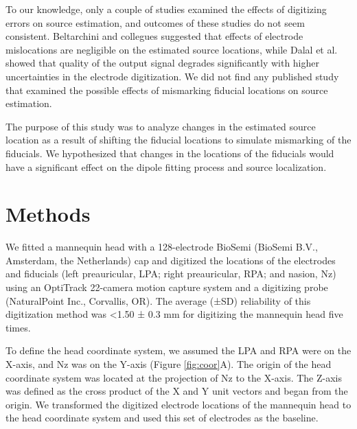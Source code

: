 \documentclass{UCF_ETD}
\begin{document}
To our knowledge, only a couple of studies examined the effects of digitizing errors on source estimation, and outcomes of these studies do not seem consistent. Beltarchini and collegues \cite{Beltrachini2011-je} suggested that effects of electrode mislocations are negligible on the estimated source locations, while Dalal et al. \cite{Dalal2014-nk} showed that quality of the output signal degrades significantly with higher uncertainties in the electrode digitization. We did not find any published study that examined the possible effects of mismarking fiducial locations on source estimation.

The purpose of this study was to analyze changes in the estimated source location as a result of shifting the fiducial locations to simulate mismarking of the fiducials. We hypothesized that changes in the locations of the fiducials would have a significant effect on the dipole fitting process and source localization.

\section{Methods}

We fitted a mannequin head with a 128-electrode BioSemi (BioSemi B.V., Amsterdam, the Netherlands) cap and digitized the locations of the electrodes and fiducials (left preauricular, LPA; right preauricular, RPA; and nasion, Nz) using an OptiTrack 22-camera motion capture system and a digitizing probe (NaturalPoint Inc., Corvallis, OR). The average (±SD) reliability of this digitization method was <1.50 ± 0.3 mm for digitizing the mannequin head five times.

To define the head coordinate system, we assumed the LPA and RPA were on the X-axis, and Nz was on the Y-axis (Figure \ref{fig:coor}A). The origin of the head coordinate system was located at the projection of Nz to the X-axis. The Z-axis was defined as the cross product of the X and Y unit vectors and began from the origin. We transformed the digitized electrode locations of the mannequin head to the head coordinate system and used this set of electrodes as the baseline.
\end{document}
